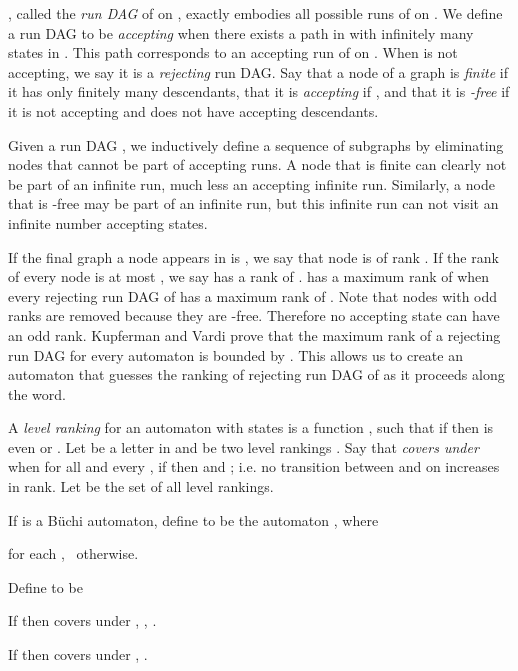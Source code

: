 \documentclass{LMCS}
\newcommand\buchi{B\"uchi }
\begin{document}
, called the \emph{run DAG} of  on , exactly embodies all possible
runs of  on . We define a run DAG  to be {\em accepting} when there exists
a path in  with infinitely many states in . This path corresponds to an
accepting run of  on . When  is not accepting, we say it is a
\emph{rejecting} run DAG.  Say that a node  of a graph is \emph{finite} if
it has only finitely many descendants, that it is {\em accepting} if , and
that it is \emph{-free} if it is not accepting and does not have 
accepting descendants.  

Given a run DAG , we inductively define a sequence of subgraphs by
eliminating nodes that cannot be part of accepting runs. A node that is finite
can clearly not be part of an infinite run, much less an accepting infinite
run. Similarly, a node that is -free may be part of an infinite run, but this
infinite run can not visit an infinite number accepting states.

\begin{iteMize}{}
\item 
\item 
\item 
\end{iteMize}
If the final graph a node appears in is , we say that
node is of rank . If the rank of every node is at most , we say  has a
rank of .   has a maximum rank of  when  every rejecting run DAG of
 has a maximum rank of .  Note that nodes with odd ranks are removed
because they are -free. Therefore no accepting state can have an odd rank.
Kupferman and Vardi prove that the maximum rank of a rejecting run DAG for every
automaton is bounded by  \cite{KV97b}. This allows us to create an automaton that
guesses the ranking of rejecting run DAG of  as it proceeds along the
word.

A \emph{level ranking} for an automaton  with  states is a function , such that if  then  is even or . Let  be a letter in
 and  be two level rankings .  Say that \emph{ covers  under } when for
all  and every , if  then  and ; i.e. no transition between  and  on  increases in rank. Let  be the set of all
level rankings.

\begin{defi}\label{KVDef}
If  is a \buchi automaton, define
 to be the automaton , where
\begin{iteMize}{}
\item  for each ,~  otherwise.
\item Define  to be
\begin{iteMize}{}
\item If  then  covers  under , 
, 
.
\item If  then  covers  under , 
.
\end{iteMize}
\end{iteMize}
\end{defi}
\end{document}
